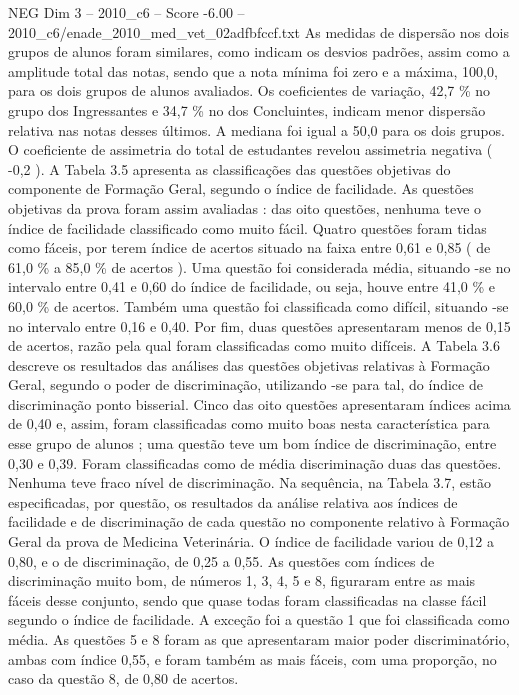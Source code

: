 \begin{textsample}{NEG Dim 3 – 2010\_c6 – Score -6.00 – 2010\_c6/enade\_2010\_med\_vet\_02adfbfccf.txt}
As medidas de dispersão nos dois grupos de alunos foram similares, como indicam os desvios padrões, assim como a amplitude total das notas, sendo que a nota mínima foi zero e a máxima, 100,0, para os dois grupos de alunos avaliados.
Os coeficientes de variação, 42,7 \% no grupo dos Ingressantes e 34,7 \% no dos Concluintes, indicam menor dispersão relativa nas notas desses últimos.
A mediana foi igual a 50,0 para os dois grupos.
O coeficiente de assimetria do total de estudantes revelou assimetria negativa ( -0,2 ).
A Tabela 3.5 apresenta as classificações das questões objetivas do componente de Formação Geral, segundo o índice de facilidade.
As questões objetivas da prova foram assim avaliadas : das oito questões, nenhuma teve o índice de facilidade classificado como muito fácil.
Quatro questões foram tidas como fáceis, por terem índice de acertos situado na faixa entre 0,61 e 0,85 ( de 61,0 \% a 85,0 \% de acertos ).
Uma questão foi considerada média, situando -se no intervalo entre 0,41 e 0,60 do índice de facilidade, ou seja, houve entre 41,0 \% e 60,0 \% de acertos.
Também uma questão foi classificada como difícil, situando -se no intervalo entre 0,16 e 0,40.
Por fim, duas questões apresentaram menos de 0,15 de acertos, razão pela qual foram classificadas como muito difíceis.
A Tabela 3.6 descreve os resultados das análises das questões objetivas relativas à Formação Geral, segundo o poder de discriminação, utilizando -se para tal, do índice de discriminação ponto bisserial.
Cinco das oito questões apresentaram índices acima de 0,40 e, assim, foram classificadas como muito boas nesta característica para esse grupo de alunos ; uma questão teve um bom índice de discriminação, entre 0,30 e 0,39.
Foram classificadas como de média discriminação duas das questões.
Nenhuma teve fraco nível de discriminação.
Na sequência, na Tabela 3.7, estão especificadas, por questão, os resultados da análise relativa aos índices de facilidade e de discriminação de cada questão no componente relativo à Formação Geral da prova de Medicina Veterinária.
O índice de facilidade variou de 0,12 a 0,80, e o de discriminação, de 0,25 a 0,55.
As questões com índices de discriminação muito bom, de números 1, 3, 4, 5 e 8, figuraram entre as mais fáceis desse conjunto, sendo que quase todas foram classificadas na classe fácil segundo o índice de facilidade.
A exceção foi a questão 1 que foi classificada como média.
As questões 5 e 8 foram as que apresentaram maior poder discriminatório, ambas com índice 0,55, e foram também as mais fáceis, com uma proporção, no caso da questão 8, de 0,80 de acertos.

\end{textsample}
